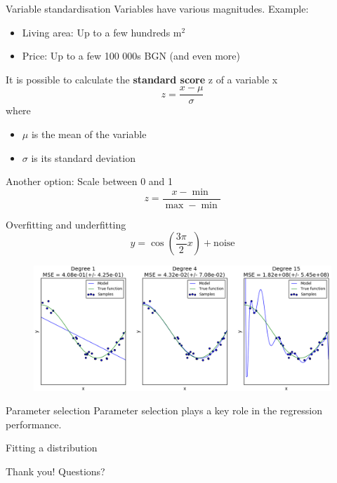 \documentclass{beamer}
\begin{document}
\begin{frame}{Variable standardisation}
Variables have various magnitudes. Example:
\begin{itemize}
	\item Living area: Up to a few hundreds m$^2$
	\item Price: Up to a few 100 000s BGN (and even more)
\end{itemize}
\vfill
\pause
It is possible to calculate the \textbf{standard score} z of a variable x
$$ z = \dfrac{x - \mu}{\sigma}$$
where
\begin{itemize}
	\item $\mu$ is the mean of the variable
	\item $\sigma$ is its standard deviation
\end{itemize}
\pause
\vfill
Another option: Scale between 0 and 1
$$ z = \dfrac{x - \min}{\max - \min}$$
\end{frame}

\begin{frame}{Overfitting and underfitting }
$$ y = \cos \left( \dfrac{3\pi}{2} x \right) + \text{noise}$$
\begin{figure}
\centering
\includegraphics[width=\textwidth]{images/over_under_fitting.png}
\end{figure}
\end{frame}

\begin{frame}{Parameter selection}
Parameter selection plays a key role in the regression performance.
\end{frame}

\begin{frame}{Fitting a distribution}

\end{frame}

\begin{frame}
\begin{center}
\Huge{Thank you! Questions?}
\end{center}
\end{frame}
\end{document}

